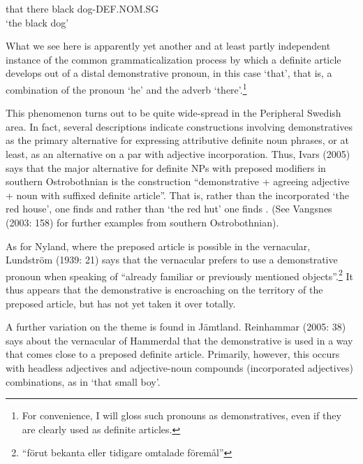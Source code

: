 that  there  black  dog-DEF.NOM.SG\\ %


‘the black dog’
\z


What we see here is apparently yet another and at least partly independent instance of the common grammaticalization process by which a definite article develops out of a distal demonstrative pronoun, in this case  ‘that’, that is, a combination of the pronoun  ‘he’ and the adverb  ‘there’.\footnote{ For convenience, I will gloss such pronouns as demonstratives, even if they are clearly used as definite articles.} 

This phenomenon turns out to be quite wide-spread in the Peripheral Swedish area. In fact, several descriptions indicate constructions involving demonstratives as the primary alternative for expressing attributive definite noun phrases, or at least, as an alternative on a par with adjective incorporation. Thus, Ivars (2005) says that the major alternative for definite NPs with preposed modifiers in southern Ostrobothnian is the construction “demonstrative  + agreeing adjective + noun with suffixed definite article”. That is, rather than the incorporated  ‘the red house’, one finds  and rather than  ‘the red hut’ one finds . (See Vangsnes (2003: 158) for further examples from southern Ostrobothnian). 

As for Nyland, where the preposed article is possible in the vernacular, Lundström (1939: 21) says that the vernacular prefers to use a demonstrative pronoun when speaking of “already familiar or previously mentioned objects”.\footnote{ “förut bekanta eller tidigare omtalade föremål”} It thus appears that the demonstrative is encroaching on the territory of the preposed article, but has not yet taken it over totally. 

A further variation on the theme is found in Jämtland. Reinhammar (2005: 38) says about the vernacular of Hammerdal that the demonstrative is used in a way that comes close to a preposed definite article. Primarily, however, this occurs with headless adjectives and adjective-noun compounds (incorporated adjectives) combinations, as in ‘that small boy’. 

